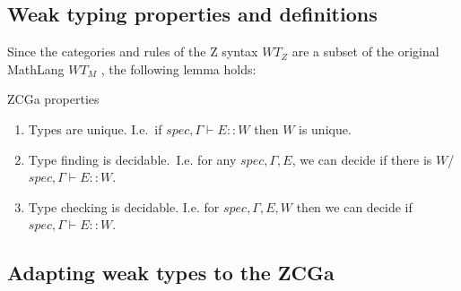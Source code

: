 
\subsection{Weak typing properties and definitions}

Since the categories and rules of the Z syntax $WT_{Z}$ are a subset of the
original MathLang $WT_{M}$ \cite{wtt}, the following lemma holds:

\begin{lemma}
ZCGa properties \\

\begin{enumerate}
\item Types are unique. I.e.\ if $spec, \Gamma \vdash E \mathbf{::} W$ then $W$
is unique.

\item Type finding is decidable.\ I.e. for any $spec, \Gamma, E$, we can decide
if there is $W$/ $spec, \Gamma \vdash E \mathbf{::}W$.

\item Type checking is decidable. I.e. for $spec, \Gamma, E, W$ then we can
decide if $spec, \Gamma \vdash E \mathbf{::}W$.
\end{enumerate}
\end{lemma}



\subsection{Adapting weak types to the ZCGa}

